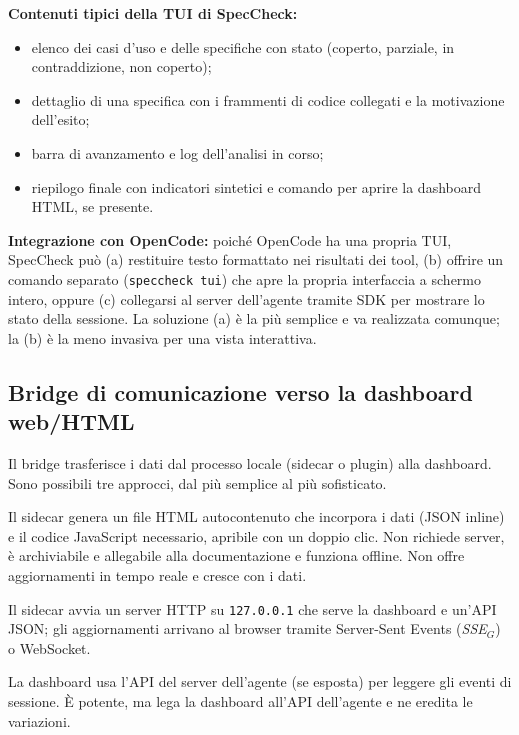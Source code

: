 \documentclass[a4paper, 11pt]{article}
\newcommand{\term}[1]{\textit{#1}$_G$} %
\begin{document}
\textbf{Contenuti tipici della TUI di SpecCheck:}
\begin{itemize}[noitemsep]
    \item elenco dei casi d'uso e delle specifiche con stato (coperto, parziale, in contraddizione, non coperto);
    \item dettaglio di una specifica con i frammenti di codice collegati e la motivazione dell'esito;
    \item barra di avanzamento e log dell'analisi in corso;
    \item riepilogo finale con indicatori sintetici e comando per aprire la dashboard HTML, se presente.
\end{itemize}

\textbf{Integrazione con OpenCode:} poiché OpenCode ha una propria TUI, SpecCheck può (a) restituire testo formattato nei risultati dei tool, (b) offrire un comando separato (\texttt{speccheck tui}) che apre la propria interfaccia a schermo intero, oppure (c) collegarsi al server dell'agente tramite SDK per mostrare lo stato della sessione. La soluzione (a) è la più semplice e va realizzata comunque; la (b) è la meno invasiva per una vista interattiva.

\subsection{Bridge di comunicazione verso la dashboard web/HTML}
Il bridge trasferisce i dati dal processo locale (sidecar o plugin) alla dashboard. Sono possibili tre approcci, dal più semplice al più sofisticato.

\begin{description}[noitemsep]
    \item[Approccio A -- report statico.] Il sidecar genera un file HTML autocontenuto che incorpora i dati (JSON inline) e il codice JavaScript necessario, apribile con un doppio clic. Non richiede server, è archiviabile e allegabile alla documentazione e funziona offline. Non offre aggiornamenti in tempo reale e cresce con i dati.
    \item[Approccio B -- server locale con aggiornamento in tempo reale.] Il sidecar avvia un server HTTP su \texttt{127.0.0.1} che serve la dashboard e un'API JSON; gli aggiornamenti arrivano al browser tramite Server-Sent Events (\term{SSE}) o WebSocket.
    \item[Approccio C -- dashboard come client dell'agente.] La dashboard usa l'API del server dell'agente (se esposta) per leggere gli eventi di sessione. È potente, ma lega la dashboard all'API dell'agente e ne eredita le variazioni.
\end{description}
\end{document}
